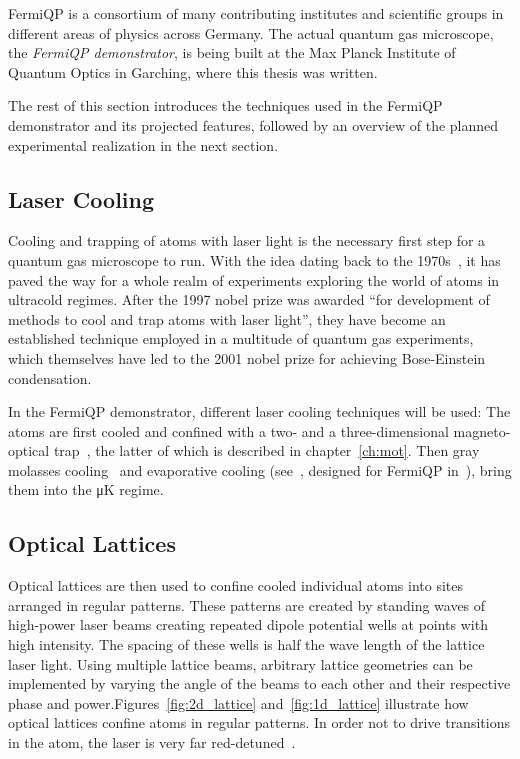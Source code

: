 FermiQP is a consortium of many contributing institutes and scientific groups in different areas of physics across Germany. The actual quantum gas microscope, the \textit{FermiQP demonstrator}, is being built at the Max Planck Institute of Quantum Optics in Garching, where this thesis was written.

The rest of this section introduces the techniques used in the FermiQP demonstrator and its projected features, followed by an overview of the planned experimental realization in the next section.

\subsection*{Laser Cooling}
Cooling and trapping of atoms with laser light is the necessary first step for a quantum gas microscope to run. With the idea dating back to the 1970s~\cite{hansch_cooling_1975}, it has paved the way for a whole realm of experiments exploring the world of atoms in ultracold regimes. After the 1997 nobel prize was awarded ``for development of methods to cool and trap atoms with laser light'', they have become an established technique employed in a multitude of quantum gas experiments, which themselves have led to the 2001 nobel prize for achieving Bose-Einstein condensation.

In the FermiQP demonstrator, different laser cooling techniques will be used: The atoms are first cooled and confined with a two- and a three-dimensional magneto-optical trap~\cite{foot_atomic_2005}, the latter of which is described in chapter~\ref{ch:mot}. Then gray molasses cooling~\cite{weidemuller_novel_1994} and evaporative cooling (see~\cite{foot_atomic_2005}, designed for FermiQP in~\cite{sun_construction_2022}), bring them into the \si[]{\micro\kelvin} regime.

\subsection*{Optical Lattices}
Optical lattices are then used to confine cooled individual atoms into sites arranged in regular patterns. These patterns are created by standing waves of high-power laser beams creating repeated dipole potential wells at points with high intensity. The spacing of these wells is half the wave length of the lattice laser light. Using multiple lattice beams, arbitrary lattice geometries can be implemented by varying the angle of the beams to each other and their respective phase and power.Figures~\ref{fig:2d_lattice} and~\ref{fig:1d_lattice} illustrate how optical lattices confine atoms in regular patterns. In order not to drive transitions in the atom, the laser is very far red-detuned~\cite{bloch_many-body_2008, bloch_quantum_2012}.

